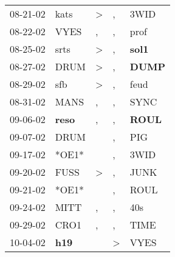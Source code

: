 \begin{supertabular}{p{0.07\textwidth}p{0.06\textwidth}p{0.02\textwidth}p{0.02\textwidth}p{0.06\textwidth}}
          08-21-02\textsuperscript{} &           kats\textsuperscript{} &     \textgreater &                , &           3WID\textsuperscript{} \\
          08-22-02\textsuperscript{} &           VYES\textsuperscript{} &                , &                , &           prof\textsuperscript{} \\
          08-25-02\textsuperscript{} &           srts\textsuperscript{} &     \textgreater &                , &  \textbf{sol1\textsuperscript{}} \\
          08-27-02\textsuperscript{} &           DRUM\textsuperscript{} &     \textgreater &                , &  \textbf{DUMP\textsuperscript{}} \\
          08-29-02\textsuperscript{} &            sfb\textsuperscript{} &     \textgreater &                , &           feud\textsuperscript{} \\
          08-31-02\textsuperscript{} &           MANS\textsuperscript{} &                , &                , &           SYNC\textsuperscript{} \\
          09-06-02\textsuperscript{} &  \textbf{reso\textsuperscript{}} &                , &                , &  \textbf{ROUL\textsuperscript{}} \\
          09-07-02\textsuperscript{} &           DRUM\textsuperscript{} &                  &                , &            PIG\textsuperscript{} \\
          09-17-02\textsuperscript{} &                            *OE1* &                  &                , &           3WID\textsuperscript{} \\
          09-20-02\textsuperscript{} &           FUSS\textsuperscript{} &     \textgreater &                , &           JUNK\textsuperscript{} \\
          09-21-02\textsuperscript{} &                            *OE1* &                  &                , &           ROUL\textsuperscript{} \\
          09-24-02\textsuperscript{} &           MITT\textsuperscript{} &                , &                , &            40s\textsuperscript{} \\
          09-29-02\textsuperscript{} &           CRO1\textsuperscript{} &                , &                , &           TIME\textsuperscript{} \\
          10-04-02\textsuperscript{} &   \textbf{h19\textsuperscript{}} &                  &     \textgreater &           VYES\textsuperscript{} \\

\end{supertabular}
